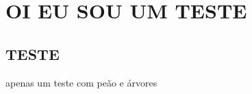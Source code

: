 \chapter{OI EU SOU UM TESTE}
\label{cap:teste}

\section{TESTE}

apenas um teste com peão e árvores \cite{hartl2012ruby}